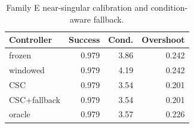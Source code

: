 \begin{table}[t]
\caption{Family E near-singular calibration and condition-aware fallback.}
\label{tab:conditioning}
\centering
\begin{tabular}{lrrr}
\toprule
Controller & Success & Cond. & Overshoot \\
\midrule
frozen & 0.979 & 3.86 & 0.242 \\
windowed & 0.979 & 4.19 & 0.242 \\
CSC & 0.979 & 3.54 & 0.201 \\
CSC+fallback & 0.979 & 3.54 & 0.201 \\
oracle & 0.979 & 3.57 & 0.226 \\
\bottomrule
\end{tabular}
\end{table}
